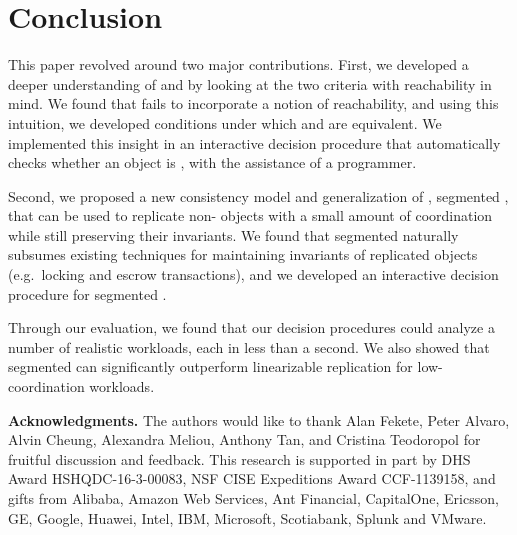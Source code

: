 \section{Conclusion}
This paper revolved around two major contributions.
%
First, we developed a deeper understanding of \invariantclosure{} and
\invariantconfluence{} by looking at the two criteria with reachability in
mind. We found that \invariantclosure{} fails to incorporate a notion of
reachability, and using this intuition, we developed conditions under which
\invariantclosure{} and \invariantconfluence{} are equivalent. We implemented
this insight in an interactive \invariantconfluence{} decision procedure
that automatically checks whether an object is \invariantconfluent{}, with the
assistance of a programmer.

Second, we proposed a new consistency model and generalization of
\invariantconfluence{}, segmented \invariantconfluence{}, that can be used to
replicate non-\invariantconfluent{} objects with a small amount of coordination
while still preserving their invariants. We found that segmented
\invariantconfluence{} naturally subsumes existing techniques for maintaining
invariants of replicated objects (e.g.\ locking and escrow transactions), and
we developed an interactive decision procedure for segmented
\invariantconfluence{}.

Through our evaluation, we found that our decision procedures could analyze a
number of realistic workloads, each in less than a second. We also showed that
segmented \invariantconfluence{} can significantly outperform linearizable
replication for low-coordination workloads.

\textbf{Acknowledgments.}
The authors would like to thank Alan Fekete, Peter Alvaro, Alvin Cheung,
Alexandra Meliou, Anthony Tan, and Cristina Teodoropol for fruitful discussion
and feedback.
%
This research is supported in part by DHS Award HSHQDC-16-3-00083, NSF CISE
Expeditions Award CCF-1139158, and gifts from Alibaba, Amazon Web Services, Ant
Financial, CapitalOne, Ericsson, GE, Google, Huawei, Intel, IBM, Microsoft,
Scotiabank, Splunk and VMware.
